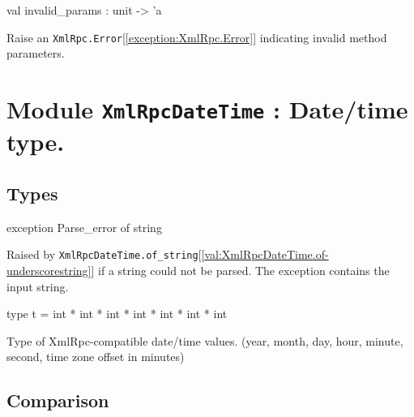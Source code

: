 \documentclass[11pt]{article}
\begin{document}
\label{val:XmlRpcServer.invalid-underscoreparams}\begin{ocamldoccode}
val invalid_params : unit -> 'a
\end{ocamldoccode}
\begin{ocamldocdescription}
Raise an {\tt{XmlRpc.Error}}[\ref{exception:XmlRpc.Error}] indicating invalid method parameters.


\end{ocamldocdescription}


\section{Module {\tt{XmlRpcDateTime}} : Date/time type.}
\label{module:XmlRpcDateTime}




\ocamldocvspace{0.5cm}



\subsection{Types}




\label{exception:XmlRpcDateTime.Parse-underscoreerror}\begin{ocamldoccode}
exception Parse_error of string
\end{ocamldoccode}
\begin{ocamldocdescription}
Raised by {\tt{XmlRpcDateTime.of\_string}}[\ref{val:XmlRpcDateTime.of-underscorestring}] if a string could not be parsed. The exception
    contains the input string.


\end{ocamldocdescription}




\label{type:XmlRpcDateTime.t}\begin{ocamldoccode}
type t = int * int * int * int * int * int * int 
\end{ocamldoccode}
\begin{ocamldocdescription}
Type of XmlRpc-compatible date/time values.
    (year, month, day, hour, minute, second, time zone offset in minutes)


\end{ocamldocdescription}




\subsection{Comparison}
\end{document}

